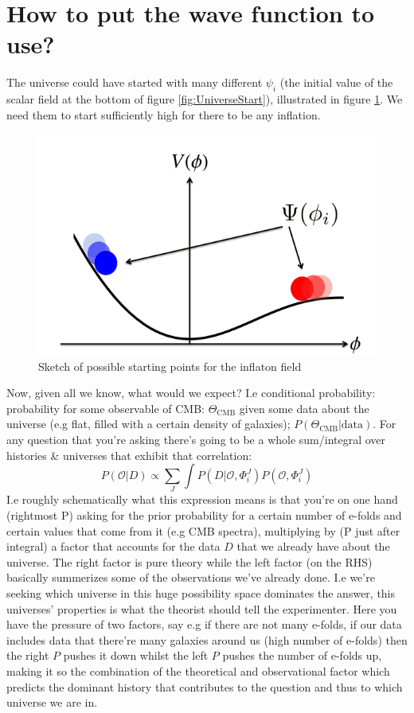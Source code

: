 \documentclass{article}
\begin{document}
  \section{How to put the wave function to use?}
  The universe could have started with many different $\psi_i$ (the initial value of the scalar field at the bottom of figure \ref{fig:UniverseStart}), illustrated in figure \ref{fig:PossibleStarts}. We need them to start sufficiently high for there to be any inflation.
   \begin{figure}
    \includegraphics[width=\textwidth]{InitialConditions.png}
    \caption{Sketch of possible starting points for the inflaton field}
    \label{fig:PossibleStarts}
  \end{figure}
  Now, given all we know, what would we expect?
  I.e conditional probability: probability for some observable of CMB: $\Theta_{\text{CMB}}$ given some data about the universe (e.g flat, filled with a certain density of galaxies); $P(\Theta_{\text{CMB}}|\text{data})$. For any question that you're asking there's going to be a whole sum/integral over histories \& universes that exhibit that correlation:
  \begin{equation}
    P(\mathcal{O}|D) \propto \sum_J\int P(D|\mathcal{O},\Phi_i^J)P(\mathcal{O},\Phi_i^J)
  \end{equation}
I.e roughly schematically what this expression means is that you're on one hand (rightmost P) asking for the prior probability for a certain number of e-folds and certain values that come from it (e.g CMB spectra), multiplying by (P just after integral) a factor that accounts for the data $D$ that we already have about the universe. The right factor is pure theory while the left factor (on the RHS) basically summerizes some of the observations we've already done. I.e we're seeking which universe in this huge possibility space dominates the answer, this universes' properties is what the theorist should tell the experimenter. Here you have the pressure of two factors, say e.g if there are not many e-folds, if our data includes data that there're many galaxies around us (high number of e-folds) then the right $P$ pushes it down whilst the left $P$ pushes the number of e-folds up, making it so the combination of the theoretical and observational factor which predicts the dominant history that contributes to the question and thus to which universe we are in.
\end{document}
